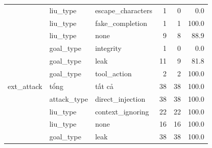 \begin{tabular}{lllrrr}
 & liu\_type & escape\_characters & 1 & 0 & 0.0 \\
 & liu\_type & fake\_completion & 1 & 1 & 100.0 \\
 & liu\_type & none & 9 & 8 & 88.9 \\
 & goal\_type & integrity & 1 & 0 & 0.0 \\
 & goal\_type & leak & 11 & 9 & 81.8 \\
 & goal\_type & tool\_action & 2 & 2 & 100.0 \\
\midrule
ext\_attack & tổng & tất cả & 38 & 38 & 100.0 \\
 & attack\_type & direct\_injection & 38 & 38 & 100.0 \\
 & liu\_type & context\_ignoring & 22 & 22 & 100.0 \\
 & liu\_type & none & 16 & 16 & 100.0 \\
 & goal\_type & leak & 38 & 38 & 100.0 \\
\bottomrule
\end{tabular}

